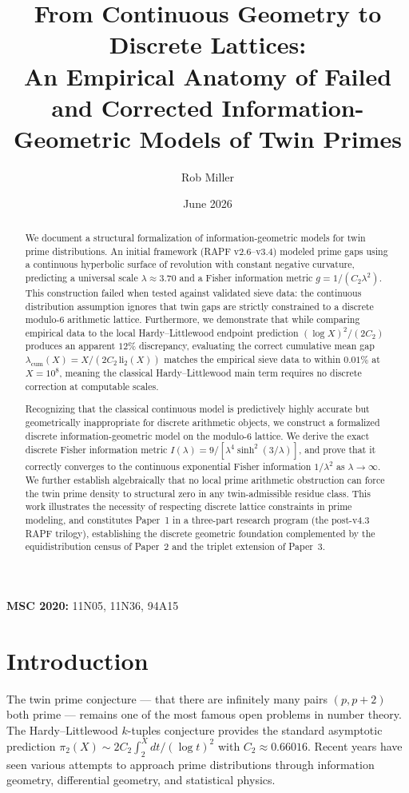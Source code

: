 \documentclass[11pt]{article}
\title{From Continuous Geometry to Discrete Lattices: \\ An Empirical Anatomy of Failed and Corrected Information-Geometric Models of Twin Primes}
\author{Rob Miller}
\date{June 2026}
\begin{document}
\maketitle

\begin{abstract}
We document a structural formalization of information-geometric models for twin prime distributions. An initial framework (RAPF v2.6--v3.4) modeled prime gaps using a continuous hyperbolic surface of revolution with constant negative curvature, predicting a universal scale $\lambda \approx 3.70$ and a Fisher information metric $g = 1/(C_2\lambda^2)$. This construction failed when tested against validated sieve data: the continuous distribution assumption ignores that twin gaps are strictly constrained to a discrete modulo-6 arithmetic lattice. Furthermore, we demonstrate that while comparing empirical data to the local Hardy--Littlewood endpoint prediction $(\log X)^2/(2C_2)$ produces an apparent $12\%$ discrepancy, evaluating the correct cumulative mean gap $\lambda_{\mathrm{cum}}(X) = X/(2C_2\,\mathrm{li}_2(X))$ matches the empirical sieve data to within $0.01\%$ at $X = 10^8$, meaning the classical Hardy--Littlewood main term requires no discrete correction at computable scales.

Recognizing that the classical continuous model is predictively highly accurate but geometrically inappropriate for discrete arithmetic objects, we construct a formalized discrete information-geometric model on the modulo-6 lattice. We derive the exact discrete Fisher information metric $I(\lambda) = 9/[\lambda^4 \sinh^2(3/\lambda)]$, and prove that it correctly converges to the continuous exponential Fisher information $1/\lambda^2$ as $\lambda \to \infty$. We further establish algebraically that no local prime arithmetic obstruction can force the twin prime density to structural zero in any twin-admissible residue class. This work illustrates the necessity of respecting discrete lattice constraints in prime modeling, and constitutes Paper~1 in a three-part research program (the post-v4.3 RAPF trilogy), establishing the discrete geometric foundation complemented by the equidistribution census of Paper~2 and the triplet extension of Paper~3.

\end{abstract}

\noindent \textbf{MSC 2020:} 11N05, 11N36, 94A15

\section{Introduction}
The twin prime conjecture --- that there are infinitely many pairs $(p, p+2)$ both prime --- remains one of the most famous open problems in number theory. The Hardy--Littlewood $k$-tuples conjecture provides the standard asymptotic prediction $\pi_2(X) \sim 2C_2 \int_2^X dt/(\log t)^2$ with $C_2 \approx 0.66016$. Recent years have seen various attempts to approach prime distributions through information geometry, differential geometry, and statistical physics.
\end{document}
